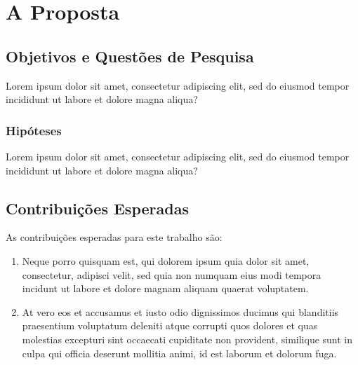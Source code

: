 %
%

\chapter{A Proposta}
\lipsum[1]

\section{Objetivos e Quest\~{o}es de Pesquisa}
\lipsum[1-2]

\begin{qpesq}
Lorem ipsum dolor sit amet, consectetur adipiscing elit, sed do eiusmod tempor incididunt ut labore et dolore magna aliqua?
\end{qpesq}

\subsection{Hip\'{o}teses}
\lipsum[1]

\begin{hipo}
Lorem ipsum dolor sit amet, consectetur adipiscing elit, sed do eiusmod tempor incididunt ut labore et dolore magna aliqua?
\end{hipo}

\section{Contribui\c{c}\~{o}es Esperadas}
As contribui\c{c}\~{o}es esperadas para este trabalho s\~{a}o:

\begin{enumerate}[label=(\roman*)]
\item Neque porro quisquam est, qui dolorem ipsum quia dolor sit amet, consectetur, adipisci velit, sed quia non numquam eius modi tempora incidunt ut labore et dolore magnam aliquam quaerat voluptatem.

\item At vero eos et accusamus et iusto odio dignissimos ducimus qui blanditiis praesentium voluptatum deleniti atque corrupti quos dolores et quas molestias excepturi sint occaecati cupiditate non provident, similique sunt in culpa qui officia deserunt mollitia animi, id est laborum et dolorum fuga.
\end{enumerate}

